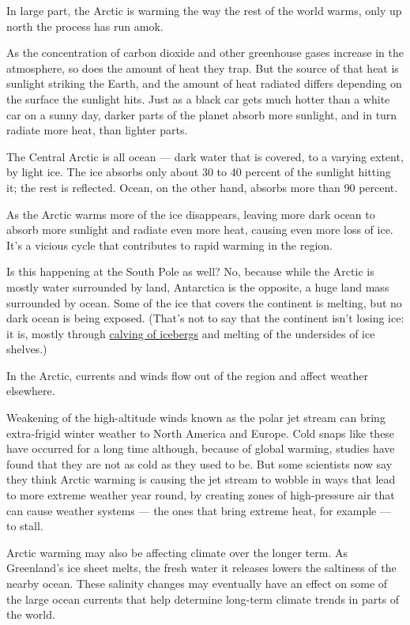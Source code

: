 In large part, the Arctic is warming the way the rest of the world
warms, only up north the process has run amok.

As the concentration of carbon dioxide and other greenhouse gases
increase in the atmosphere, so does the amount of heat they trap. But
the source of that heat is sunlight striking the Earth, and the amount
of heat radiated differs depending on the surface the sunlight hits.
Just as a black car gets much hotter than a white car on a sunny day,
darker parts of the planet absorb more sunlight, and in turn radiate
more heat, than lighter parts.

The Central Arctic is all ocean --- dark water that is covered, to a
varying extent, by light ice. The ice absorbs only about 30 to 40
percent of the sunlight hitting it; the rest is reflected. Ocean, on the
other hand, absorbs more than 90 percent.

As the Arctic warms more of the ice disappears, leaving more dark ocean
to absorb more sunlight and radiate even more heat, causing even more
loss of ice. It's a vicious cycle that contributes to rapid warming in
the region.

Is this happening at the South Pole as well? No, because while the
Arctic is mostly water surrounded by land, Antarctica is the opposite, a
huge land mass surrounded by ocean. Some of the ice that covers the
continent is melting, but no dark ocean is being exposed. (That's not to
say that the continent isn't losing ice: it is, mostly through
\href{https://www.nytimes3xbfgragh.onion/2019/10/01/climate/antarctica-iceberg-d28.html}{calving
of icebergs} and melting of the undersides of ice shelves.)

In the Arctic, currents and winds flow out of the region and affect
weather elsewhere.

Weakening of the high-altitude winds known as the polar jet stream can
bring extra-frigid winter weather to North America and Europe. Cold
snaps like these have occurred for a long time although, because of
global warming, studies have found that they are not as cold as they
used to be. But some scientists now say they think Arctic warming is
causing the jet stream to wobble in ways that lead to more extreme
weather year round, by creating zones of high-pressure air that can
cause weather systems --- the ones that bring extreme heat, for example
--- to stall.

Arctic warming may also be affecting climate over the longer term. As
Greenland's ice sheet melts, the fresh water it releases lowers the
saltiness of the nearby ocean. These salinity changes may eventually
have an effect on some of the large ocean currents that help determine
long-term climate trends in parts of the world.


